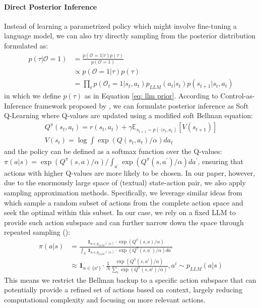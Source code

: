 \paragraph{Direct Posterior Inference} Instead of learning a parametrized policy which might involve fine-tuning a language model, we can also try directly sampling from the posterior distribution formulated as:
\begin{equation}
\begin{aligned}
     p(\tau|\mathcal{O}=1) & = \frac{p(\mathcal{O}=1|\tau)p(\tau)}{p(\mathcal{O}=1)}\\
     & \propto p(\mathcal{O}=1|\tau)p(\tau) \\
     & = \prod_{t}p(\mathcal{O}_t=1|s_t, a_t)p_{LLM}(a_t|s_t)p(s_{t+1}|s_{t}, a_t)
\end{aligned}
\end{equation}
in which we define $p(\tau)$ as in Equation \ref{eq: llm prior}. According to Control-as-Inference framework proposed by \cite{levine2018reinforcement}, we can formulate posterior inference as Soft Q-Learning where Q-values are updated using a modified soft Bellman equation:
\begin{equation}
\begin{aligned}
    Q^{\pi}(s_t, a_t) = r(s_t, a_t) + \gamma \mathbb{E}_{s_{t+1}\sim p(\cdot|s_t, a_t)}\left[V(s_{t+1}) \right] \\
    V(s_t) = \log\int \exp (Q(s_t, a_t)/\alpha) da_t
\end{aligned}
\end{equation}
and the policy can be defined as a softmax function over the Q-values: $\pi(a|s) = \exp(Q^{\pi}(s,a)/\alpha) / \int_{a^{'}} \exp(Q^{\pi}(s,a^{'})/\alpha) da^{'}$, ensuring that actions with higher Q-values are more likely to be chosen. In our paper, however, due to the enormously large space of (textual) state-action pair, we also apply sampling approximation methods. Specifically, we leverage similar ideas from \cite{fourati2024stochastic} which sample a random subset of actions from the complete action space and seek the optimal within this subset. In our case, we rely on a fixed LLM to provide such action subspace and can further narrow down the space through repeated sampling (\cite{brown2024large}):
\begin{equation}
\begin{aligned}
    \pi(a|s) & = \frac{\mathbf{1}_{a \in p_{LLM}(\cdot|s) } \cdot \exp\left(Q^{\pi}(s, a)/\alpha\right)}{
    \int_{a^{'}} \mathbf{1}_{a \in p_{LLM}(\cdot|s) } \cdot \exp\left(Q^{\pi}(s, a^{'})/\alpha\right) da^{'}
    } \\
    & \approx \mathbf{1}_{a\in\{a^i\}} \cdot \frac{1}{N} \frac{\exp(Q^{\pi}(s, a^{i})/\alpha)}{\sum_{i}\exp(Q^{\pi}(s, a^{i})/\alpha)}, a^i \sim p_{LLM}(a|s)
\end{aligned}
\end{equation}
This means we restrict the Bellman backup to a specific action subspace that can potentially provide a refined set of actions based on context, largely reducing computational complexity and focusing on more relevant actions.





